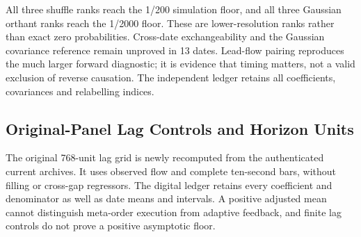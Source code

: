 \documentclass[12pt]{article}
\theoremstyle{definition}
\theoremstyle{remark}
\begin{document}
All three shuffle ranks reach the 1/200 simulation floor, and all three Gaussian orthant ranks reach the 1/2000 floor. These are lower-resolution ranks rather than exact zero probabilities. Cross-date exchangeability and the Gaussian covariance reference remain unproved in 13 dates. Lead-flow pairing reproduces the much larger forward diagnostic; it is evidence that timing matters, not a valid exclusion of reverse causation. The independent ledger retains all coefficients, covariances and relabelling indices.

\subsection{Original-Panel Lag Controls and Horizon Units}
The original 768-unit lag grid is newly recomputed from the authenticated current archives. It uses observed flow and complete ten-second bars, without filling or cross-gap regressors. The digital ledger retains every coefficient and denominator as well as date means and intervals. A positive adjusted mean cannot distinguish meta-order execution from adaptive feedback, and finite lag controls do not prove a positive asymptotic floor.
\begin{table}[htbp]
\centering\footnotesize\setlength{\tabcolsep}{3pt}
\caption{Fresh controls on all 768 original study units, using observed flow. $L$ counts ten-second bars: the displayed horizons are 10, 50, 150, 300, 600 and 900 seconds. $L=1$ equals baseline VAR. Date intervals and every segment denominator are retained in the digital ledger.}
\label{tab:lag_memory_controls}
\end{table}
\end{document}
